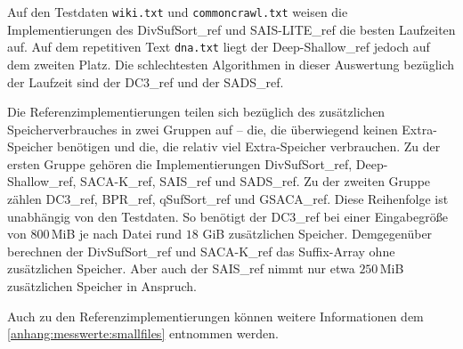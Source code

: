 Auf den Testdaten \texttt{wiki.txt} und \texttt{commoncrawl.txt} weisen die Implementierungen des DivSufSort\_ref und SAIS-LITE\_ref die besten Laufzeiten auf. Auf dem repetitiven Text \texttt{dna.txt} liegt der Deep-Shallow\_ref jedoch auf dem zweiten Platz. Die schlechtesten Algorithmen in dieser Auswertung bezüglich der Laufzeit sind der DC3\_ref und der SADS\_ref.

Die Referenzimplementierungen teilen sich bezüglich des zusätzlichen Speicherverbrauches in zwei Gruppen auf -- die, die überwiegend keinen Extra-Speicher benötigen und die, die relativ viel Extra-Speicher verbrauchen. Zu der ersten Gruppe gehören die Implementierungen DivSufSort\_ref, Deep-Shal\-low\_ref, SACA-K\_ref, SAIS\_ref und SADS\_ref. Zu der zweiten Gruppe zählen DC3\_ref, BPR\_ref, qSufSort\_ref und GSACA\_ref. Diese Reihenfolge ist unabhängig von den Testdaten. So benötigt der DC3\_ref bei einer Eingabegröße von $800$\,MiB je nach Datei rund $18$ GiB zusätzlichen Speicher. Demgegenüber berechnen der DivSufSort\_ref und SACA-K\_ref das Suffix-Array ohne zusätzlichen Speicher. Aber auch der SAIS\_ref nimmt nur etwa $250$\,MiB zusätzlichen Speicher in Anspruch.

Auch zu den Referenzimplementierungen können weitere Informationen dem \cref{anhang:messwerte:smallfiles} entnommen werden.
